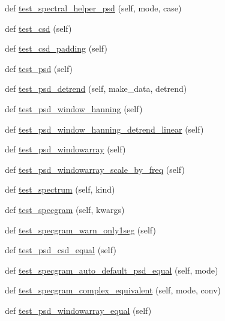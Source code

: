\begin{DoxyCompactItemize}
\item 
def \hyperlink{classmatplotlib_1_1tests_1_1test__mlab_1_1TestSpectral_a8477b9cdc9d9fce0bce9862b50aa1ec5}{test\+\_\+spectral\+\_\+helper\+\_\+psd} (self, mode, case)
\item 
def \hyperlink{classmatplotlib_1_1tests_1_1test__mlab_1_1TestSpectral_afc94ce4b28c24bedf7b1eae413cc1e0e}{test\+\_\+csd} (self)
\item 
def \hyperlink{classmatplotlib_1_1tests_1_1test__mlab_1_1TestSpectral_a81c549f20b6343d08e30bbb8f2946e4a}{test\+\_\+csd\+\_\+padding} (self)
\item 
def \hyperlink{classmatplotlib_1_1tests_1_1test__mlab_1_1TestSpectral_ae187db57a66288a6b40aeffb5a2d5f51}{test\+\_\+psd} (self)
\item 
def \hyperlink{classmatplotlib_1_1tests_1_1test__mlab_1_1TestSpectral_a6ab021bb9980a906e0cb24071b97b298}{test\+\_\+psd\+\_\+detrend} (self, make\+\_\+data, detrend)
\item 
def \hyperlink{classmatplotlib_1_1tests_1_1test__mlab_1_1TestSpectral_ae64a19e3dacc31564c3f1ac1ded5dc64}{test\+\_\+psd\+\_\+window\+\_\+hanning} (self)
\item 
def \hyperlink{classmatplotlib_1_1tests_1_1test__mlab_1_1TestSpectral_aa8bdd85406ef124694e78dd88fef03df}{test\+\_\+psd\+\_\+window\+\_\+hanning\+\_\+detrend\+\_\+linear} (self)
\item 
def \hyperlink{classmatplotlib_1_1tests_1_1test__mlab_1_1TestSpectral_a2ccddcbeaf8e16f7d35d921a86aebf34}{test\+\_\+psd\+\_\+windowarray} (self)
\item 
def \hyperlink{classmatplotlib_1_1tests_1_1test__mlab_1_1TestSpectral_a30dce7a3b84c548ba0140fc74ff3cb72}{test\+\_\+psd\+\_\+windowarray\+\_\+scale\+\_\+by\+\_\+freq} (self)
\item 
def \hyperlink{classmatplotlib_1_1tests_1_1test__mlab_1_1TestSpectral_a1835237da7b6fd7256fc45d9aa028b42}{test\+\_\+spectrum} (self, kind)
\item 
def \hyperlink{classmatplotlib_1_1tests_1_1test__mlab_1_1TestSpectral_af40ea05eb6e775cf4b0815f6e850e2fc}{test\+\_\+specgram} (self, kwargs)
\item 
def \hyperlink{classmatplotlib_1_1tests_1_1test__mlab_1_1TestSpectral_ab7410816e5c0055c9a15d6b0d0f68cdb}{test\+\_\+specgram\+\_\+warn\+\_\+only1seg} (self)
\item 
def \hyperlink{classmatplotlib_1_1tests_1_1test__mlab_1_1TestSpectral_ac68c1b36cc34925de4a8c9ac4d6c83e0}{test\+\_\+psd\+\_\+csd\+\_\+equal} (self)
\item 
def \hyperlink{classmatplotlib_1_1tests_1_1test__mlab_1_1TestSpectral_a03e25211b2fe3dd2f535803d55d91188}{test\+\_\+specgram\+\_\+auto\+\_\+default\+\_\+psd\+\_\+equal} (self, mode)
\item 
def \hyperlink{classmatplotlib_1_1tests_1_1test__mlab_1_1TestSpectral_ace76998d0b8c38a27a0e86d00ccd855c}{test\+\_\+specgram\+\_\+complex\+\_\+equivalent} (self, mode, conv)
\item 
def \hyperlink{classmatplotlib_1_1tests_1_1test__mlab_1_1TestSpectral_a8ca65dcebe958b9720684bebdba13731}{test\+\_\+psd\+\_\+windowarray\+\_\+equal} (self)
\end{DoxyCompactItemize}
